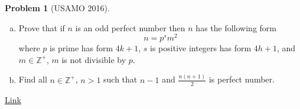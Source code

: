 \documentclass[]{article}
\theoremstyle{definition}
\newtheorem{problem}{Problem}
\begin{document}
\begin{problem}[USAMO 2016]
	$ $
	\begin{enumerate}[(a)]
		\item Prove that if $n$ is an odd perfect number then $n$ has the following form \[ n=p^sm^2 \]where $p$ is prime has form $4k+1$, $s$ is positive integers has form $4h+1$, and $m\in\mathbb{Z}^+$, $m$ is not divisible by $p$.
		\item Find all $n\in\mathbb{Z}^+$, $n>1$ such that $n-1$ and $\frac{n(n+1)}{2}$ is perfect number.
	\end{enumerate}
	\flushright \href{http://artofproblemsolving.com/community/c6h1182397p5729489}{Link}
\end{problem}
\end{document}
